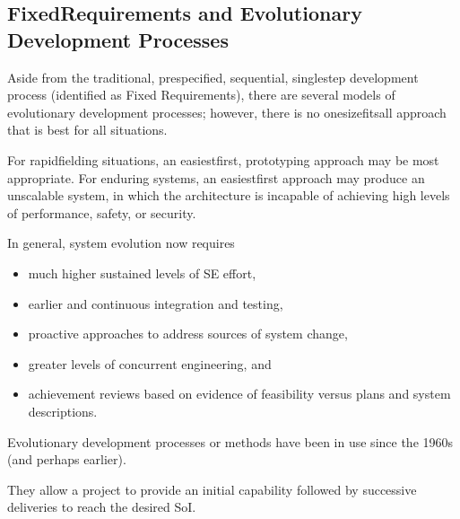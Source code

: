 \documentclass[letterpaper,10pt,english]{jupyterBook}
\begin{document}
\subsection{Fixed\sphinxhyphen{}Requirements and Evolutionary Development Processes}
\label{\detokenize{SE/sebok:fixed-requirements-and-evolutionary-development-processes}}
\sphinxAtStartPar
Aside from the traditional, pre\sphinxhyphen{}specified, sequential, single\sphinxhyphen{}step development process (identified as Fixed Requirements), there are several models of evolutionary development processes; however, there is no one\sphinxhyphen{}size\sphinxhyphen{}fits\sphinxhyphen{}all approach that is best for all situations.

\sphinxAtStartPar
For rapid\sphinxhyphen{}fielding situations, an easiest\sphinxhyphen{}first, prototyping approach may be most appropriate.
For enduring systems, an easiest\sphinxhyphen{}first approach may produce an unscalable system, in which the architecture is incapable of achieving high levels of performance, safety, or security.

\sphinxAtStartPar
In general, system evolution now requires
\begin{itemize}
\item {} 
\sphinxAtStartPar
much higher sustained levels of SE effort,

\item {} 
\sphinxAtStartPar
earlier and continuous integration and testing,

\item {} 
\sphinxAtStartPar
proactive approaches to address sources of system change,

\item {} 
\sphinxAtStartPar
greater levels of concurrent engineering, and

\item {} 
\sphinxAtStartPar
achievement reviews based on evidence of feasibility versus plans and system descriptions.

\end{itemize}

\sphinxAtStartPar
Evolutionary development processes or methods have been in use since the 1960s (and perhaps earlier).

\sphinxAtStartPar
They allow a project to provide an initial capability followed by successive deliveries to reach the desired SoI.
\end{document}
